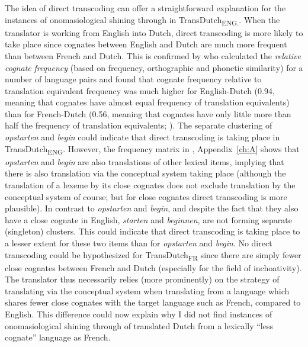 The idea of direct transcoding can offer a straightforward explanation for the instances of onomasiological shining through in TransDutch\textsubscript{ENG.}. When the translator is working from English into Dutch, direct transcoding is more likely to take place since cognates between English and Dutch are much more frequent than between French and Dutch. This is confirmed by \citet{schepens_cross-language_2013} who calculated the \textit{relative} \textit{cognate} \textit{frequency} (based on frequency, orthographic and phonetic similarity) for a number of language pairs and found that cognate frequency relative to translation equivalent frequency was much higher for English-Dutch (0.94, meaning that cognates have almost equal frequency of translation equivalents) than for French-Dutch (0.56, meaning that cognates have only little more than half the frequency of translation equivalents; \citealt[4]{schepens_cross-language_2013}). The separate clustering of \textit{opstarten} and \textit{begin} could indicate that direct transcoding is taking place in TransDutch\textsubscript{ENG}. However, the frequency matrix in , Appendix~\ref{ch:A} shows that \textit{opstarten} and \textit{begin} are also translations of other lexical items, implying that there is also translation via the conceptual system taking place (although the translation of a lexeme by its close cognates does not exclude translation by the conceptual system of course; but for close cognates direct transcoding is more plausible). In contrast to \textit{opstarten} and \textit{begin}, and despite the fact that they also have a close cognate in English, \textit{starten} and \textit{beginnen}, are not forming separate (singleton) clusters. This could indicate that direct transcoding is taking place to a lesser extent for these two items than for \textit{opstarten} and \textit{begin}. No direct transcoding could be hypothesized for TransDutch\textsubscript{FR} since there are simply fewer close cognates between French and Dutch (especially for the field of inchoativity). The translator thus necessarily relies (more prominently) on the strategy of translating via the conceptual system when translating from a language which shares fewer close cognates with the target language such as French, compared to English. This difference could now explain why I did not find instances of onomasiological shining through of translated Dutch from a lexically ``less cognate'' language as French.

